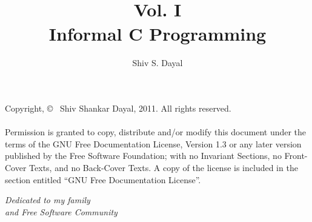 \documentclass[10pt, twoside, openright]{memoir}
\title{\sffamily\color{cyan}\HUGE{\textbf{Computer Programming with 
      GNU/Linux}}\\\vspace*{1cm}\Large{Vol. I}\\\vspace*{1cm}\LARGE{\textbf{Informal
      C Programming}}\vspace*{2cm}}
\author{\vspace*{1cm}\LARGE{Shiv S. Dayal}}
\date{}
\begin{document}
\minitoc
\minilof
\minilot
\maketitle
\thispagestyle{empty}
\pagestyle{empty}
\vfill
\newpage
\vspace*{6in}
Copyright, \copyright~ Shiv Shankar Dayal, 2011. All rights reserved.\\\\
Permission is granted to copy, distribute and/or modify this document under the
terms of the GNU Free Documentation License, Version 1.3 or any later version
published by the Free Software Foundation; with no Invariant Sections, no
Front-Cover Texts, and no Back-Cover Texts. A copy of the license is included
in the section entitled ``GNU Free Documentation License''.
\newpage
\vspace*{2in}
\begin{center}
  \Large \it Dedicated to my family\\and Free Software Community
\end{center}
\newpage
\setcounter{page}{1}
\tableofcontents
\newpage
\listoffigures
\newpage
\listoftables
\newpage
\pagestyle{fancy}
\frontmatter
\setcounter{page}{1} 

\newpage
\mainmatter
{}






\backmatter
\printindex
\end{document}
